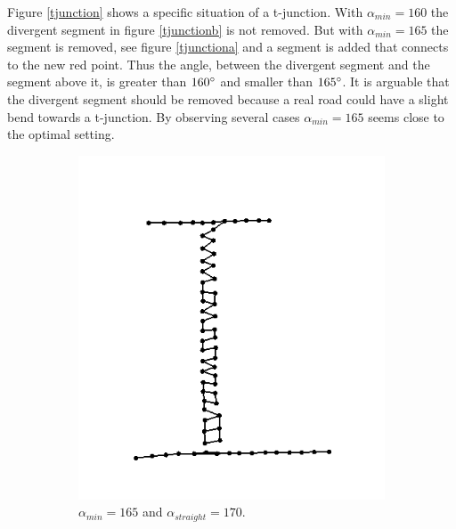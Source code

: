 \documentclass[11pt]{article}
\begin{document}
Figure \ref{tjunction} shows a specific situation of a t-junction. With $\alpha_{min}=160$ the divergent segment in figure \ref{tjunctionb} is not removed. But with $\alpha_{min}=165$ the segment is removed, see figure \ref{tjunctiona} and a segment is added that connects to the new red point. Thus the angle, between the divergent segment and the segment above it, is greater than $160\degree$ and smaller than $165\degree$.  It is arguable that the divergent segment should be removed because a real road could have a slight bend towards a t-junction. By observing several cases $\alpha_{min}=165$ seems close to the optimal setting.

\begin{figure}[h]
\centering
  \begin{subfigure}{0.4\linewidth}
  \centering
  \graphicspath{ {images/}}
  \includegraphics[width=\linewidth]{parallel165_165}
  \caption{$\alpha_{min}=165$ and $\alpha_{straight}=170$.}
  \label{parallel}
  \end{subfigure}
    \begin{subfigure}{0.4\linewidth}
  \centering
  \graphicspath{ {images/}}

\end{subfigure}
\end{figure}
\end{document}
